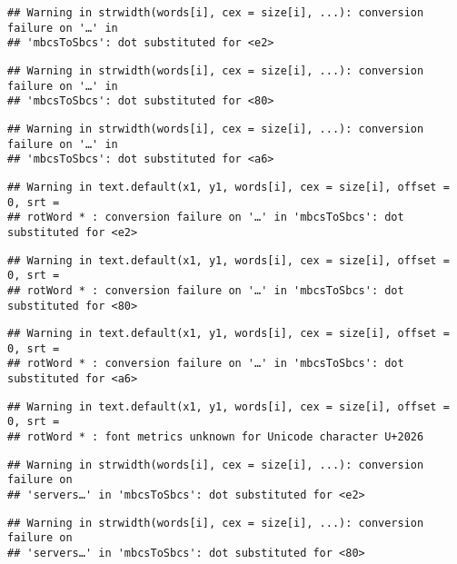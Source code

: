 \documentclass[]{article}
\begin{document}
\begin{verbatim}
## Warning in strwidth(words[i], cex = size[i], ...): conversion failure on '…' in
## 'mbcsToSbcs': dot substituted for <e2>
\end{verbatim}

\begin{verbatim}
## Warning in strwidth(words[i], cex = size[i], ...): conversion failure on '…' in
## 'mbcsToSbcs': dot substituted for <80>
\end{verbatim}

\begin{verbatim}
## Warning in strwidth(words[i], cex = size[i], ...): conversion failure on '…' in
## 'mbcsToSbcs': dot substituted for <a6>
\end{verbatim}

\begin{verbatim}
## Warning in text.default(x1, y1, words[i], cex = size[i], offset = 0, srt =
## rotWord * : conversion failure on '…' in 'mbcsToSbcs': dot substituted for <e2>
\end{verbatim}

\begin{verbatim}
## Warning in text.default(x1, y1, words[i], cex = size[i], offset = 0, srt =
## rotWord * : conversion failure on '…' in 'mbcsToSbcs': dot substituted for <80>
\end{verbatim}

\begin{verbatim}
## Warning in text.default(x1, y1, words[i], cex = size[i], offset = 0, srt =
## rotWord * : conversion failure on '…' in 'mbcsToSbcs': dot substituted for <a6>
\end{verbatim}

\begin{verbatim}
## Warning in text.default(x1, y1, words[i], cex = size[i], offset = 0, srt =
## rotWord * : font metrics unknown for Unicode character U+2026
\end{verbatim}

\begin{verbatim}
## Warning in strwidth(words[i], cex = size[i], ...): conversion failure on
## 'servers…' in 'mbcsToSbcs': dot substituted for <e2>
\end{verbatim}

\begin{verbatim}
## Warning in strwidth(words[i], cex = size[i], ...): conversion failure on
## 'servers…' in 'mbcsToSbcs': dot substituted for <80>
\end{verbatim}
\end{document}
